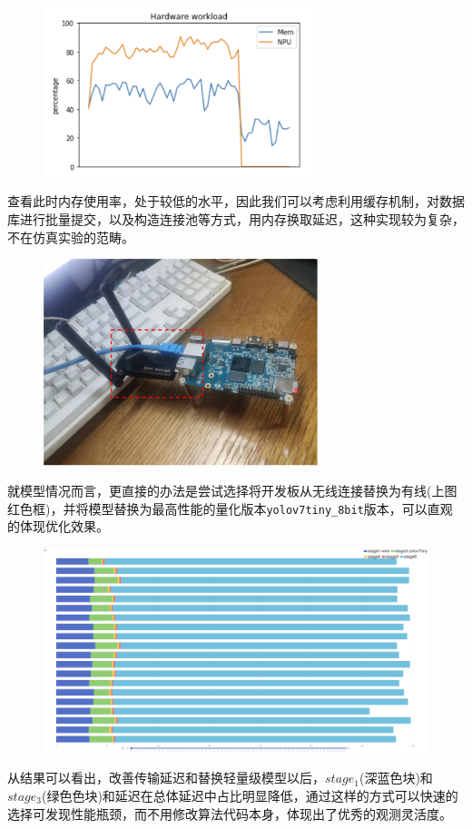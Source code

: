 \documentclass[master]{shtthesis}
\begin{document}
\begin{figure}[H]
	\centering
	\includegraphics[width=8cm]{img/hw_c.png}
	\label{负载曲线}
\end{figure}
查看此时内存使用率，处于较低的水平，因此我们可以考虑利用缓存机制，对数据库进行批量提交，以及构造连接池等方式，用内存换取延迟，这种实现较为复杂，不在仿真实验的范畴。


\begin{figure}[H]
	\centering
	\includegraphics[width=8cm]{img/port.pdf}
	\label{网卡接入}
\end{figure}

就模型情况而言，更直接的办法是尝试选择将开发板从无线连接替换为有线(上图红色框)，并将模型替换为最高性能的量化版本\verb*|yolov7tiny_8bit|版本，可以直观的体现优化效果。
\begin{figure}[H]
	\centering
	\includegraphics[width=15cm]{img/echarts2.png}
	\label{优化后阶段延迟}
\end{figure}
从结果可以看出，改善传输延迟和替换轻量级模型以后，$stage_1$(深蓝色块)和$stage_3$(绿色色块)和延迟在总体延迟中占比明显降低，通过这样的方式可以快速的选择可发现性能瓶颈，而不用修改算法代码本身，体现出了优秀的观测灵活度。
\end{document}
